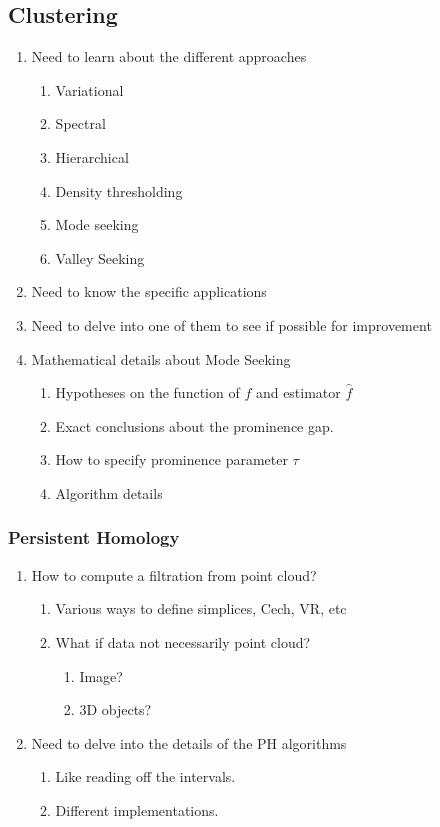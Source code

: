 \documentclass[10pt,a4paper]{article}
\begin{document}
\subsection{Clustering}
\begin{enumerate}
	\item Need to learn about the different approaches 
	\begin{enumerate}
		\item Variational
		\item Spectral
		\item Hierarchical
		\item Density thresholding
		\item Mode seeking
		\item Valley Seeking
	\end{enumerate}
	\item Need to know the specific applications
	\item Need to delve into one of them to see if possible for improvement
	\item Mathematical details about Mode Seeking
	\begin{enumerate}
		\item Hypotheses on the function of $f$ and estimator $\hat{f}$
		\item Exact conclusions about the prominence gap.
		\item How to specify prominence parameter $\tau$
		\item Algorithm details
	\end{enumerate}
\end{enumerate}
\subsubsection{Persistent Homology}
\begin{enumerate}
	\item How to compute a filtration from point cloud?
	\begin{enumerate}
		\item Various ways to define simplices, Cech, VR, etc
		\item What if data not necessarily point cloud?
		\begin{enumerate}
			\item Image?
			\item 3D objects?
		\end{enumerate}
	\end{enumerate}
	\item Need to delve into the details of the PH algorithms
	\begin{enumerate}
		\item Like reading off the intervals.
		\item Different implementations.
	\end{enumerate}
\end{enumerate}
\end{document}
